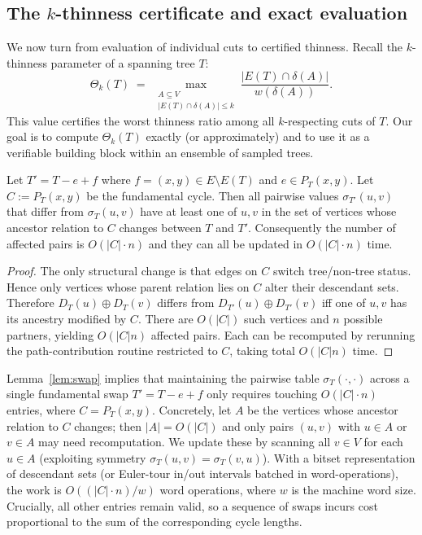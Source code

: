 \documentclass[11pt,letterpaper]{article}
\begin{document}
\subsection{The $k$-thinness certificate and exact evaluation}
\label{sec:theta-def-eval}

We now turn from evaluation of individual cuts to certified thinness.
Recall the $k$-thinness parameter of a spanning tree $T$:
\[
\Theta_k(T) \;=\;
\max_{\substack{A\subseteq V\\ |E(T)\cap\delta(A)|\le k}}
  \frac{|E(T)\cap\delta(A)|}{w(\delta(A))}.
\]
This value certifies the worst thinness ratio among all
$k$-respecting cuts of $T$.
Our goal is to compute $\Theta_k(T)$ exactly (or approximately) and
to use it as a verifiable building block within an ensemble of sampled trees.

\begin{lemma}
\label{lem:swap}
Let $T' = T - e + f$ where $f=(x,y)\in E\setminus E(T)$ and $e\in P_T(x,y)$.
Let $C := P_T(x,y)$ be the fundamental cycle.
Then all pairwise values $\sigma_{T'}(u,v)$ that differ from $\sigma_T(u,v)$
have at least one of $u,v$ in the set of vertices whose ancestor relation
to $C$ changes between $T$ and $T'$.
Consequently the number of affected pairs is $O(|C|\cdot n)$ and they
can all be updated in $O(|C|\cdot n)$ time.
\end{lemma}

\begin{proof}
The only structural change is that edges on $C$ switch tree/non-tree status.
Hence only vertices whose parent relation lies on $C$ alter their descendant sets.
Therefore $D_T(u)\oplus D_T(v)$ differs from $D_{T'}(u)\oplus D_{T'}(v)$
iff one of $u,v$ has its ancestry modified by $C$.
There are $O(|C|)$ such vertices and $n$ possible partners, yielding
$O(|C|n)$ affected pairs.
Each can be recomputed by rerunning the path-contribution routine
restricted to $C$, taking total $O(|C|n)$ time.
\end{proof}

Lemma~\ref{lem:swap} implies that maintaining the pairwise table
$\sigma_T(\cdot,\cdot)$ across a single fundamental swap $T' = T-e+f$
only requires touching $O(|C|\cdot n)$ entries, where $C=P_T(x,y)$.
Concretely, let $A$ be the vertices whose ancestor relation to $C$
changes; then $|A|=O(|C|)$ and only pairs $(u,v)$ with $u\in A$ or
$v\in A$ may need recomputation. We update these by scanning all
$v\in V$ for each $u\in A$ (exploiting symmetry $\sigma_T(u,v)=
\sigma_T(v,u)$). With a bitset representation of descendant sets
(or Euler-tour in/out intervals batched in word-operations),
the work is $O((|C|\cdot n)/w)$ word operations, where $w$ is the
machine word size. Crucially, all other entries remain valid, so a
sequence of swaps incurs cost proportional to the sum of the
corresponding cycle lengths. 
\end{document}

